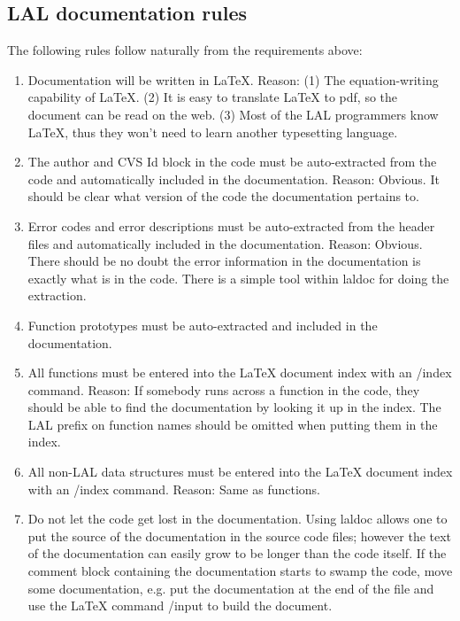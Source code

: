 \documentclass[]{ligodcc}
\begin{document}
\subsection{LAL documentation rules}

The following rules follow naturally from the requirements above:

\begin{enumerate}
\item
Documentation will be written in LaTeX. Reason: (1) The
equation-writing capability of LaTeX.  (2) It is easy to translate
LaTeX to pdf, so the document can be read on the web. (3) Most of the
LAL programmers know LaTeX, thus they won't need to learn another
typesetting language.
\item
The author and CVS Id block in the code must be auto-extracted
from the code and automatically included in the documentation. Reason:
Obvious. It should be clear what version of the code the documentation
pertains to.
\item
Error codes and error descriptions must be auto-extracted from the
header files and automatically included in the documentation.  Reason:
Obvious. There should be no doubt the error information in the
documentation is exactly what is in the code. There is a simple tool
within laldoc for doing the extraction.
\item
Function prototypes must be auto-extracted and included in the
documentation.
\item
All functions must be entered into the LaTeX document index
with an /index{} command. Reason: If somebody runs across a function
in the code, they should be able to find the documentation  by looking
it up in the index. The LAL prefix on function names should be omitted
when putting them in the index.
\item
All non-LAL data structures  must be entered into the LaTeX
document index with an /index{} command. Reason: Same as functions.
\item
Do not let the code get lost in the documentation. Using
laldoc allows one to put the source of the documentation in the source
code files; however the text of the documentation can easily grow to
be longer than the code itself.  If the comment block containing the
documentation starts to swamp the code, move some documentation,
e.g. put the documentation at the end of the file and use the LaTeX
command  /input{} to build the document.

\end{enumerate}
\end{document}
